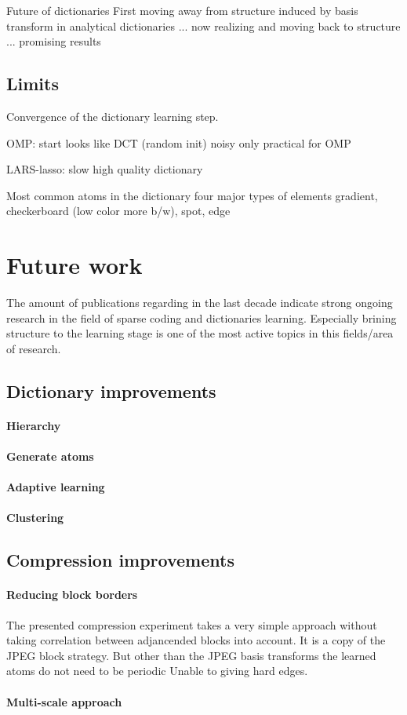 Future of dictionaries
First moving away from structure induced by basis transform in analytical
dictionaries ... now realizing and moving back to structure ... promising
results\cite{?,?,?}



\subsection*{Limits}
Convergence of the dictionary learning step.

OMP:
  start looks like DCT (random init)
  noisy
  only practical for OMP

LARS-lasso:
  slow 
  high quality dictionary

  Most common atoms in the dictionary 
  four major types of elements
  gradient, checkerboard (low color more b/w), spot, edge

\section{Future work}
The amount of publications regarding in
the last decade indicate strong ongoing research in the field of sparse coding
and dictionaries learning. Especially brining structure to the learning stage is
one of the most active topics in this fields/area of research. 

\subsection{Dictionary improvements}
\paragraph{Hierarchy}
\paragraph{Generate atoms}
\paragraph{Adaptive learning}
\paragraph{Clustering}

\subsection{Compression improvements}
\paragraph{Reducing block borders} The presented compression experiment
takes a very simple approach without taking correlation between adjancended
blocks into account. It is a copy of the JPEG block strategy. But other than
the JPEG basis transforms the learned atoms do not need to be periodic
Unable to giving
hard edges. 


\paragraph{Multi-scale approach}

